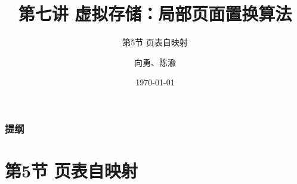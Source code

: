 


\title[第7讲]{第七讲 虚拟存储：局部页面置换算法} %
\subtitle{第5节 页表自映射}
\author{向勇、陈渝} %
\date{\today} %



\begin{frame}
\titlepage %
\end{frame}

\begin{frame}
\frametitle{提纲} %
\tableofcontents %
\end{frame}
\section{第5节 页表自映射}%
